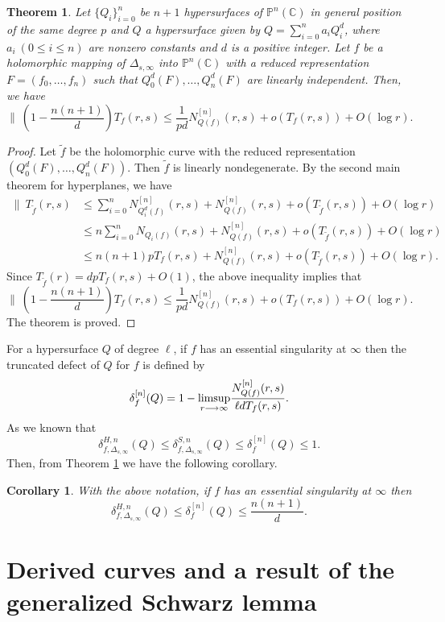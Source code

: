 \documentclass[12pt,article]{amsart}
\newtheorem{corollary}[equation]{Corollary}
\newtheorem{theorem}[equation]{Theorem}
\newcommand{\C}{{\mathbb{C}}}
\renewcommand{\P}{{\mathbb{P}}}
\numberwithin{equation}{section}
\begin{document}
\begin{theorem}\label{thm2.7} 
Let $\{Q_i\}_{i=0}^n$ be $n+1$ hypersurfaces of $\P^n(\C)$ in general position of the same degree $p$ and $Q$ a hypersurface given by $Q=\sum_{i=0}^na_iQ_i^d$, where $a_i\ (0\le i\le n)$ are nonzero constants and $d$ is a positive integer. Let $f$ be a holomorphic mapping of $\Delta_{s,\infty}$ into $\P^n(\C)$ with a reduced representation $F=(f_0,\ldots,f_n)$ such that $Q_0^d(F),\ldots,Q_n^d(F)$ are linearly independent. Then, we have
$$ \biggl \|\ \left(1-\frac{n(n+1)}{d}\right)T_f(r,s)\le \frac{1}{pd}N^{[n]}_{Q(f)}(r,s)+o(T_f(r,s))+O(\log r).$$
\end{theorem}
\begin{proof}
Let $\tilde f$ be the holomorphic curve with the reduced representation $(Q_0^d(F),\ldots,Q_n^d(F))$. Then $\tilde f$ is linearly nondegenerate. By the second main theorem for hyperplanes, we have
\begin{align*}
\bigl\|\ T_{\tilde f}(r,s)&\le\sum_{i=0}^nN^{[n]}_{Q_i^d(f)}(r,s)+N^{[n]}_{Q(f)}(r,s)+o(T_{\tilde f}(r,s))+O(\log r)\\
&\le n\sum_{i=0}^nN_{Q_i(f)}(r,s)+N^{[n]}_{Q(f)}(r,s)+o(T_{\tilde f}(r,s))+O(\log r)\\
&\le n(n+1)pT_f(r,s)+N^{[n]}_{Q(f)}(r,s)+o(T_{\tilde f}(r,s))+O(\log r).
\end{align*}
Since $T_{\tilde f}(r)=dpT_f(r,s)+O(1)$, the above inequality implies that
$$ \biggl \|\ \left(1-\frac{n(n+1)}{d}\right)T_f(r,s)\le \frac{1}{pd}N^{[n]}_{Q(f)}(r,s)+o(T_f(r,s))+O(\log r).$$
The theorem is proved.
\end{proof}

For a hypersurface $Q$ of degree $\ell$, if $f$ has an essential singularity at $\infty$ then the truncated defect of $Q$ for $f$ is defined by
$$ \delta^{[n]}_f(Q)=1-\underset{r\longrightarrow\infty}{\rm limsup}\dfrac{N_{Q(f)}^{[n]}(r,s)}{\ell dT_f(r,s)}.$$
As we known that
$$\delta^{H,n}_{f,\Delta_{s,\infty}}(Q)\le\delta_{f,\Delta_{s,\infty}}^{S,n}(Q)\le\delta_f^{[n]}(Q)\le 1.$$
Then, from Theorem \ref{thm2.7} we have the following corollary.
\begin{corollary}\label{cor2.9}
With the above notation, if $f$ has an essential singularity at $\infty$ then
$$\delta^{H,n}_{f,\Delta_{s,\infty}}(Q)\le\delta^{[n]}_f(Q)\le \dfrac{n(n+1)}{d}.$$
\end{corollary}

\section{Derived curves and a result of the generalized Schwarz lemma}
\end{document}
